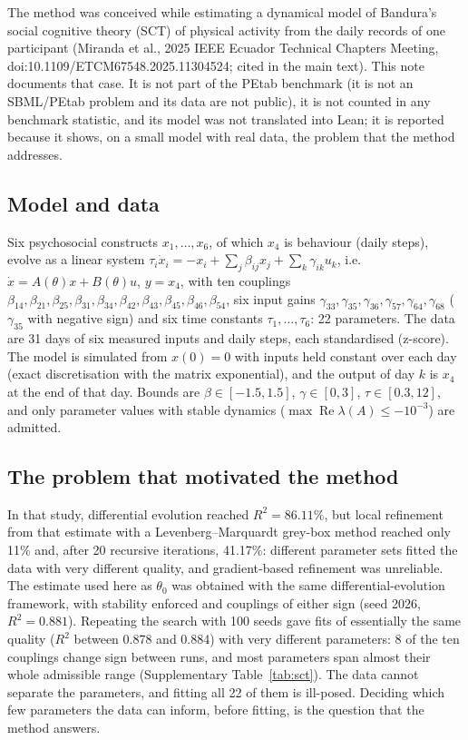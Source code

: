 
The method was conceived while estimating a dynamical model of Bandura's social cognitive theory (SCT) of physical activity from the daily records of one participant (Miranda et al., 2025 IEEE Ecuador Technical Chapters Meeting, doi:10.1109/ETCM67548.2025.11304524; cited in the main text). This note documents that case. It is not part of the PEtab benchmark (it is not an SBML/PEtab problem and its data are not public), it is not counted in any benchmark statistic, and its model was not translated into Lean; it is reported because it shows, on a small model with real data, the problem that the method addresses.

\subsection*{Model and data}
Six psychosocial constructs $x_1,\dots,x_6$, of which $x_4$ is behaviour (daily steps), evolve as a linear system $\tau_i\dot x_i=-x_i+\sum_j\beta_{ij}x_j+\sum_k\gamma_{ik}u_k$, i.e.\ $\dot x=A(\theta)x+B(\theta)u$, $y=x_4$, with ten couplings $\beta_{14},\beta_{21},\beta_{25},\beta_{31},\beta_{34},\beta_{42},\beta_{43},\beta_{45},\beta_{46},\beta_{54}$, six input gains $\gamma_{33},\gamma_{35},\gamma_{36},\gamma_{57},\gamma_{64},\gamma_{68}$ ($\gamma_{35}$ with negative sign) and six time constants $\tau_1,\dots,\tau_6$: 22 parameters. The data are 31 days of six measured inputs and daily steps, each standardised (z-score). The model is simulated from $x(0)=0$ with inputs held constant over each day (exact discretisation with the matrix exponential), and the output of day $k$ is $x_4$ at the end of that day. Bounds are $\beta\in[-1.5,1.5]$, $\gamma\in[0,3]$, $\tau\in[0.3,12]$, and only parameter values with stable dynamics ($\max\operatorname{Re}\lambda(A)\le-10^{-3}$) are admitted.

\subsection*{The problem that motivated the method}
In that study, differential evolution reached $R^2=86.11\%$, but local refinement from that estimate with a Levenberg--Marquardt grey-box method reached only 11\% and, after 20 recursive iterations, 41.17\%: different parameter sets fitted the data with very different quality, and gradient-based refinement was unreliable. The estimate used here as $\theta_0$ was obtained with the same differential-evolution framework, with stability enforced and couplings of either sign (seed 2026, $R^2=0.881$). Repeating the search with 100 seeds gave fits of essentially the same quality ($R^2$ between 0.878 and 0.884) with very different parameters: 8 of the ten couplings change sign between runs, and most parameters span almost their whole admissible range (Supplementary Table~\ref{tab:sct}). The data cannot separate the parameters, and fitting all 22 of them is ill-posed. Deciding which few parameters the data can inform, before fitting, is the question that the method answers.

